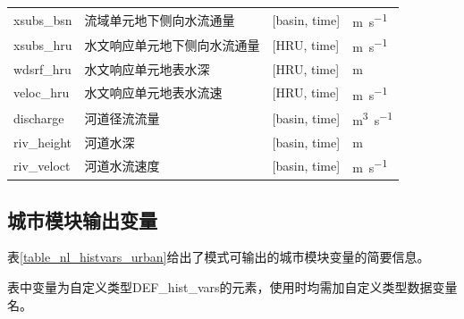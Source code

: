 \documentclass[a4paper,12pt,twoside]{article}
\begin{document}
{\begin{longtable}[htbp]{lp{}p{}l}
xsubs\_bsn   & 流域单元地下侧向水流通量 & {[}basin, time{]} & \unit{m.s^{-1}} \\
xsubs\_hru   & 水文响应单元地下侧向水流通量 & {[}HRU, time{]} & \unit{m.s^{-1}} \\
wdsrf\_hru   & 水文响应单元地表水深 & {[}HRU, time{]} & m \\
veloc\_hru   & 水文响应单元地表水流速 & {[}HRU, time{]} & \unit{m.s^{-1}} \\
discharge    & 河道径流流量 & {[}basin, time{]} & \unit{m^3.s^{-1}} \\
riv\_height  & 河道水深 & {[}basin, time{]} & \unit{m} \\
riv\_veloct  & 河道水流速度 & {[}basin, time{]} & \unit{m.s^{-1}} \\

\end{longtable}}

\subsection{城市模块输出变量}

表\ref{table_nl_histvars_urban}给出了模式可输出的城市模块变量的简要信息。\par
表中变量为自定义类型DEF\_hist\_vars的元素，使用时均需加自定义类型数据变量名。
\end{document}
